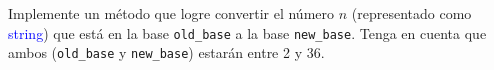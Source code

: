 Implemente un método que logre convertir el número $n$ (representado como \textcolor{blue}{string}) que está en la base \texttt{old\_base} a la base \texttt{new\_base}. Tenga en cuenta que ambos (\texttt{old\_base} y \texttt{new\_base}) estarán entre 2 y 36.